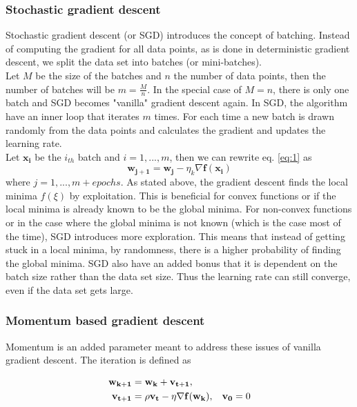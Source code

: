\documentclass{article}
\begin{document}
\subsubsection{Stochastic gradient descent}
Stochastic gradient descent (or SGD) introduces the concept of batching. Instead of computing the gradient for all data points, as is done in deterministic gradient descent, we split the data set into batches (or mini-batches). \\
Let $M$ be the size of the batches and $n$ the number of data points, then the number of batches will be $m = \frac{M}{n}$. In the special case of $M = n$, there is only one batch and SGD becomes "vanilla" gradient descent again. In SGD, the algorithm have an inner loop that iterates $m$ times. For each time a new batch is drawn randomly from the data points and calculates the gradient and updates the learning rate. \\
Let $\mathbf{x_i}$ be the $i_{th}$ batch and $i=1,...,m$, then we can rewrite eq. \ref{eq:1} as
\begin{equation*}
        \mathbf{w_{j+1}} = \mathbf{w_j} - \eta_k\nabla\mathbf{f(x_i)}
\end{equation*}
where $j=1,...,m+epochs$. As stated above, the gradient descent finds the local minima $f(\xi)$ by exploitation. This is beneficial for convex functions or if the local minima is already known to be the global minima. For non-convex functions or in the case where the global minima is not known (which is the case most of the time), SGD introduces more exploration. This means that instead of getting stuck in a local minima, by randomness, there is a higher probability of finding the global minima. SGD also have an added bonus that it is dependent on the batch size rather than the data set size. Thus the learning rate can still converge, even if the data set gets large.

\subsubsection{Momentum based gradient descent}
Momentum is an added parameter meant to address these issues of vanilla gradient descent. The iteration is defined as

\begin{align*}
    \mathbf{w_{k+1}} &= \mathbf{w_k} + \mathbf{v_{t+1}}, \\
    \mathbf{v_{t+1}} &= \rho \mathbf{v_t} - \eta\mathbf{\nabla f(w_k)}, \hspace{3mm} \mathbf{v_0} = 0
\end{align*}
\end{document}
